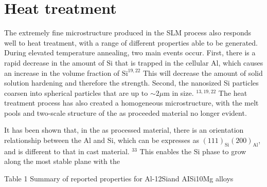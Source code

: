 \documentclass[10pt]{article}
\begin{document}
\section*{Heat treatment}
The extremely fine microstructure produced in the SLM process also responds well to heat treatment, with a range of different properties able to be generated. During elevated temperature annealing, two main events occur. First, there is a rapid decrease in the amount of $\mathrm{Si}$ that is trapped in the cellular $\mathrm{Al}$, which causes an increase in the volume fraction of $\mathrm{Si}^{19,22}$ This will decrease the amount of solid solution hardening and therefore the strength. Second, the nanosized Si particles coarsen into spherical particles that are up to $\sim 2 \mu \mathrm{m}$ in size. ${ }^{13,19,22}$ The heat treatment process has also created a homogeneous microstructure, with the melt pools and two-scale structure of the as proceeded material no longer evident.

It has been shown that, in the as processed material, there is an orientation relationship between the $\mathrm{Al}$ and $\mathrm{Si}$, which can be expresses as $(111)_{\mathrm{Si}}(200)_{\mathrm{Al}}$, and is different to that in cast material. ${ }^{33}$ This enables the $\mathrm{Si}$ phase to grow along the most stable plane with the

Table 1 Summary of reported properties for Al-12Siand AISi10Mg alloys
\end{document}
